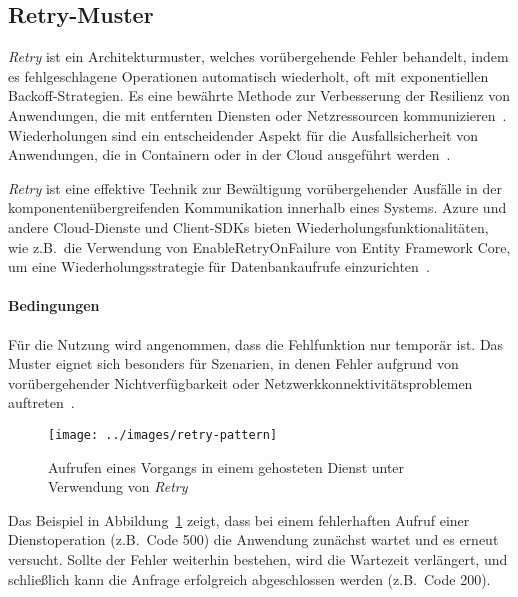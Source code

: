 \subsection{Retry-Muster}

\textit{Retry} ist ein Architekturmuster, welches vorübergehende Fehler behandelt,
indem es fehlgeschlagene Operationen automatisch wiederholt, oft mit exponentiellen Backoff-Strategien.
Es eine bewährte Methode zur Verbesserung der Resilienz von Anwendungen,
die mit entfernten Diensten oder Netzressourcen kommunizieren~\cite{Meheden.2021}.
Wiederholungen sind ein entscheidender Aspekt für die Ausfallsicherheit von Anwendungen,
die in Containern oder in der Cloud ausgeführt werden~\cite{Haley.28.06.2018}.

\textit{Retry} ist eine effektive Technik zur Bewältigung vorübergehender Ausfälle in der
komponentenübergreifenden Kommunikation innerhalb eines Systems.
Azure und andere Cloud-Dienste und Client-SDKs bieten Wiederholungsfunktionalitäten, wie z.B.\ die Verwendung von
EnableRetryOnFailure von Entity Framework Core, um eine Wiederholungsstrategie für Datenbankaufrufe einzurichten~\cite{Haley.28.06.2018}.


\paragraph{Bedingungen}

Für die Nutzung wird angenommen, dass die Fehlfunktion nur temporär ist.
Das Muster eignet sich besonders für Szenarien, in denen Fehler aufgrund von vorübergehender Nichtverfügbarkeit
oder Netzwerkkonnektivitätsproblemen auftreten~\cite{Meheden.2021}.

\begin{figure}[t]
    \centering
    \texttt{[image: ../images/retry-pattern]}
    \caption{Aufrufen eines Vorgangs in einem gehosteten Dienst unter Verwendung von \textit{Retry}~\cite{Microsoft.}}
    \label{fig:retry}
\end{figure}

Das Beispiel in Abbildung~\ref{fig:retry} zeigt, dass bei einem fehlerhaften Aufruf einer Dienstoperation
(z.B.\ Code 500) die Anwendung zunächst wartet und es erneut versucht.
Sollte der Fehler weiterhin bestehen, wird die Wartezeit verlängert, und schließlich
kann die Anfrage erfolgreich abgeschlossen werden (z.B.\ Code 200).

